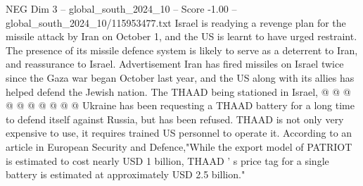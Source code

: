 \begin{textsample}{NEG Dim 3 – global\_south\_2024\_10 – Score -1.00 – global\_south\_2024\_10/115953477.txt}
Israel is readying a revenge plan for the missile attack by Iran on October 1, and the US is learnt to have urged restraint.
The presence of its missile defence system is likely to serve as a deterrent to Iran, and reassurance to Israel.
Advertisement Iran has fired missiles on Israel twice since the Gaza war began October last year, and the US along with its allies has helped defend the Jewish nation.
The THAAD being stationed in Israel, @ @ @ @ @ @ @ @ @ @ Ukraine has been requesting a THAAD battery for a long time to defend itself against Russia, but has been refused.
THAAD is not only very expensive to use, it requires trained US personnel to operate it.
According to an article in European Security and Defence,"While the export model of PATRIOT is estimated to cost nearly USD 1 billion, THAAD ' s price tag for a single battery is estimated at approximately USD 2.5 billion."

\end{textsample}
